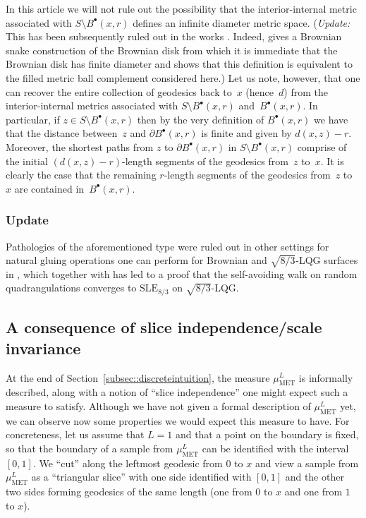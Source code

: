 \documentclass[10pt]{amsart}
\newcommand{\sbullet}{{\scriptscriptstyle\bullet}}
\theoremstyle{plain}
\numberwithin{theorem}{section}
\theoremstyle{definition}
\newcommand{\SLE}{\mathrm{SLE}}
\newcommand{\muml}{\mu_{\mathrm{MET}}^L}
\newcommand{\fb}[2]{B^\sbullet(#1,#2)}
\begin{document}
In this article we will not rule out the possibility that the interior-internal metric associated with $S \setminus \fb{x}{r}$ defines an infinite diameter metric space. (\emph{Update:} This has been subsequently ruled out in the works \cite{bettinelli_miermont_disks,lg2019disksnake}. Indeed, \cite{bettinelli_miermont_disks} gives a Brownian snake construction of the Brownian disk from which it is immediate that the Brownian disk has finite diameter and \cite{lg2019disksnake} shows that this definition is equivalent to the filled metric ball complement considered here.) Let us note, however, that one can recover the entire collection of geodesics back to~$x$ (hence~$d$) from the interior-internal metrics associated with $S \setminus \fb{x}{r}$ and~$\fb{x}{r}$. In particular, if $z \in S \setminus \fb{x}{r}$ then by the very definition of $\fb{x}{r}$ we have that the distance between~$z$ and $\partial \fb{x}{r}$ is finite and given by $d(x,z)-r$. Moreover, the shortest paths from $z$ to $\partial \fb{x}{r}$ in $S \setminus \fb{x}{r}$ comprise of the initial $(d(x,z)-r)$-length segments of the geodesics from~$z$ to~$x$. It is clearly the case that the remaining $r$-length segments of the geodesics from~$z$ to~$x$ are contained in~$\fb{x}{r}$.

\subsubsection*{Update} Pathologies of the aforementioned type were ruled out in other settings for natural gluing operations one can perform for Brownian and $\sqrt{8/3}$-LQG surfaces in \cite{gwynne-miller:gluing}, which together with \cite{gwynne-miller:saw,gwynne-miller:uihpq} has led to a proof that the self-avoiding walk on random quadrangulations converges to $\SLE_{8/3}$ on $\sqrt{8/3}$-LQG.

\subsection{A consequence of slice independence/scale invariance}
\label{subsec::slice_independence}

At the end of Section~\ref{subsec::discreteintuition}, the measure $\muml$ is informally described, along with a notion of ``slice independence'' one might expect such a measure to satisfy. Although we have not given a formal description of $\muml$ yet, we can observe now some properties we would expect this measure to have. For concreteness, let us assume that $L=1$ and that a point on the boundary is fixed, so that the boundary of a sample from $\muml$ can be identified with the interval $[0,1]$. We ``cut'' along the leftmost geodesic from $0$ to $x$ and view a sample from $\muml$ as a ``triangular slice'' with one side identified with $[0,1]$ and the other two sides forming geodesics of the same length (one from $0$ to $x$ and one from $1$ to $x$).
\end{document}
